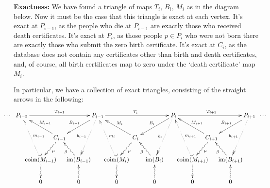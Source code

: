 \documentclass[11pt]{article}
\begin{document}
\begin{Births Deaths and Marriages}
\Bullet \textbf{Exactness:} We have found a triangle of maps
$T_{i},\,B_{i},\,M_{i}$ as in the diagram below. Now it must be the case that
this triangle is exact at each vertex. It's exact at $P_{i-1}$, as the people
who die at $P_{i-1}$ are exactly those who received death certificates. It's
exact at $P_i$, as those people $p\in P_i$ who were not born there are exactly
those who submit the zero birth certificate. It's exact at $C_i$, as the
database does not contain any certificates other than birth and death
certificates, and, of course, all birth certificates map to zero under the
`death certificate' map $M_i$.

In particular, we have a collection of exact triangles, consisting of the
straight arrows in the following:
\[\xymatrix@!0@C=1.1cm@R=1.28cm{
\makebox[0cm][r]{$\cdots$\ \ }
P_{i-2}\ar[rrrr]^{T_{i-1}}%
&&&&\ar[dll]_{B_{i-1}}
\ar@{..>>}[ddl]_{b_{i-1}}
P_{i-1}\ar[rrrr]^{T_{i  }}%
&&&&\ar[dll]_{B_{i  }}
\ar@{..>>}[ddl]_{b_{i  }}
P_{i  }\ar[rrrr]^{T_{i+1}}%
&&&&\ar[dll]_{B_{i+1}}
\ar@{..>>}[ddl]_{b_{i+1}}
P_{i+1}\makebox[0cm][l]{\ \ $\cdots$}\\
&&C_{i-1}\ar[ull]_{M_{i-1}}\ar@{~>}[dl]^\mu&&
&&C_{i  }\ar[ull]_{M_{i  }}\ar@{~>}[dl]^\mu&&
&&C_{i+1}\ar[ull]_{M_{i+1}}\ar@{~>}[dl]^\mu&&
\\
&\coim(M_{i-1})\ar@{~>}[d]\ar@{_{(}..>}[uul]_{m_{i-1}}
&&\im(B_{i-1})\ar@{~>}[ul]^\beta&
&\coim(M_{i  })\ar@{~>}[d]\ar@{_{(}..>}[uul]_{m_{i  }}
&&\im(B_{i  })\ar@{~>}[ul]^\beta&
&\coim(M_{i+1})\ar@{~>}[d]\ar@{_{(}..>}[uul]_{m_{i+1}}
&&\im(B_{i+1})\ar@{~>}[ul]^\beta&
\\
&0&&0\ar@{~>}[u]&
&0&&0\ar@{~>}[u]&
&0&&0\ar@{~>}[u]&
}\]


\end{Births Deaths and Marriages}
\end{document}
